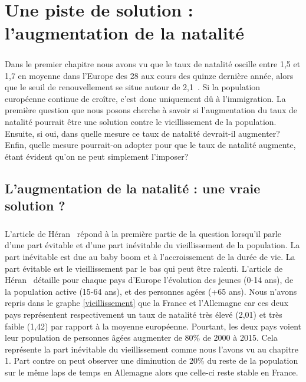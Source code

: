 \chapter{Une piste de solution : l'augmentation de la natalité}
\paragraph{}Dans le premier chapitre nous avons vu que le taux de natalité oscille entre 1,5 et 1,7 en moyenne dans l’Europe des 28 aux cours des quinze dernière année, alors que le seuil de renouvellement se situe autour de 2,1~\citep{eur-lex}. Si la population européenne continue de croître, c’est donc uniquement dû à l’immigration.  La première question que nous posons cherche à savoir si l’augmentation du taux de natalité pourrait être une solution contre le vieillissement de la population. Ensuite, si oui, dans quelle mesure ce taux de natalité devrait-il augmenter? Enfin, quelle mesure pourrait-on adopter pour que le taux de natalité augmente, étant évident qu'on ne peut simplement l'imposer?
\section{L'augmentation de la natalité : une vraie solution ?}
\paragraph{}L’article de Héran~\citep[pp.1]{heran} répond à la première partie de la question lorsqu’il parle d’une part évitable et d’une part inévitable du vieillissement de la population. La part inévitable est due au baby boom et à l’accroissement de la durée de vie. La part évitable est le vieillissement par le bas qui peut être ralenti. L’article de Héran~\citep[pp.5-6]{heran} détaille pour chaque pays d’Europe l’évolution des jeunes (0-14 ans), de la population active (15-64 ans), et des personnes agées (+65 ans). Nous n’avons repris dans le graphe \ref{vieillissement} que la France et l’Allemagne car ces deux pays représentent respectivement un taux de natalité très élevé (2,01) et très faible (1,42) par rapport à la moyenne européenne. Pourtant, les deux pays voient leur population de personnes âgées augmenter de 80\% de 2000 à 2015. Cela représente la part inévitable du vieillissement comme nous l'avons vu au chapitre 1. Part contre on peut observer une diminution de 20\% du reste de la population sur le même laps de temps en Allemagne alors que celle-ci reste stable en France. 

